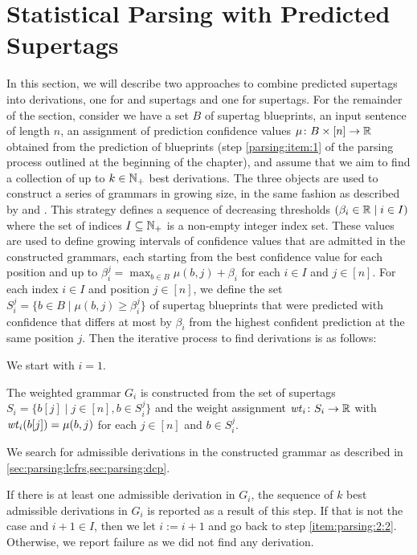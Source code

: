 \documentclass[../../document.tex]{subfiles}
\begin{document}
    \section{Statistical Parsing with Predicted Supertags}\label{sec:parsing}
    In this section, we will describe two approaches to combine predicted supertags into derivations, one for  and  supertags and one for  supertags.
    For the remainder of the section, consider we have a set \(B\) of supertag blueprints, an input sentence of length \(n\), an assignment of prediction confidence values \(\mu\colon B \times [n] \to \mathbb{R}\) obtained from the prediction of blueprints (step \ref{parsing:item:1} of the parsing process outlined at the beginning of the chapter), and assume that we aim to find a collection of up to \(k \in \mathbb{N}_+\) best derivations.
    The three objects are used to construct a series of grammars in growing size, in the same fashion as described by \citet[Section~5.1]{Clark04} and \citet[Section~2.2.2]{Auli12}.
    This strategy defines a sequence of decreasing thresholds \((\beta_i \in \mathbb{R} \mid i \in I)\) where the set of indices \(I \subseteq \mathbb{N}_+\) is a non-empty integer index set.
    These values are used to define growing intervals of confidence values that are admitted in the constructed grammars, each starting from the best confidence value for each position and up to \(\beta_i^j = \max_{b \in B} \mu(b, j) + \beta_i\) for each \(i \in I\) and \(j \in [n]\).
    For each index \(i \in I\) and position \(j \in [n]\), we define the set \(S_i^j = \{ b \in B \mid \mu(b, j) \ge \beta^j_i \}\) of supertag blueprints that were predicted with confidence that differs at most by \(\beta_i\) from the highest confident prediction at the same position \(j\).
    Then the iterative process to find derivations is as follows:
    \begin{compactenum}
        \item We start with \(i = 1\).
        \item \label{item:parsing:2:2}
            The weighted grammar \(G_i\) is constructed from the set of supertags \(S_i = \{b[j] \mid j \in [n], b \in S_i^j \}\) and the weight assignment \(\mathit{wt}_{i}\colon S_i \to \mathbb{R}\) with \(\mathit{wt}_i(b[j]) = \mu(b, j)\) for each \(j \in [n]\) and \(b \in S_i^j\).
        \item We search for admissible derivations in the constructed grammar as described in \cref{sec:parsing:lcfrs,sec:parsing:dcp}.
        \item
            If there is at least one admissible derivation in \(G_i\), the sequence of \(k\) best admissible derivations in \(G_i\) is reported as a result of this step.
            If that is not the case and \(i+1 \in I\), then we let \(i := i+1\) and go back to step \ref{item:parsing:2:2}.
            Otherwise, we report failure as we did not find any derivation.
    \end{compactenum}
\end{document}
